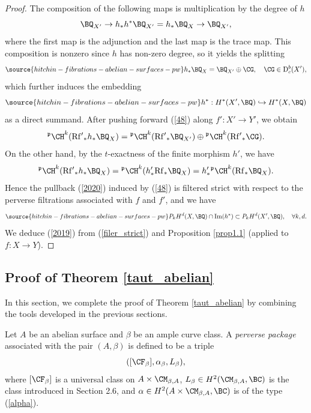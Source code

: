 \begin{proof}
The composition of the following maps is multiplication by the degree of $h$
\[
\BQ_{X'} \to h_*h^* \BQ_{X'} = h_*\BQ_X \to \BQ_{X'},
\]
where the first map is the adjunction and the last map is the trace map. This composition is nonzero since $h$ has non-zero degree, so it yields the splitting
\begin{equation}\label{48}
\source{hitchin-fibrations-abelian-surfaces-pw}
h_* \BQ_X = \BQ_{X'} \oplus \CG, \quad \CG \in \mathrm{D}^b_c(X'),
\end{equation}
which further induces the embedding
\begin{equation}\label{2020}
\source{hitchin-fibrations-abelian-surfaces-pw}
h^*: H^*(X', \BQ) \hookrightarrow H^*(X, \BQ)
\end{equation}
as a  direct summand. After pushing forward (\ref{48}) along $f': X' \to Y'$, we obtain
\[
{^\mathfrak{p} \CH}^k(\mathrm{Rf'}_\ast h_\ast \BQ_X) = {^\mathfrak{p} \CH}^k(\mathrm{Rf'}_\ast \BQ_{X'}) \oplus {^\mathfrak{p} \CH}^k(\mathrm{Rf'}_\ast \CG).
\]
On the other hand, by the $t$-exactness of the finite morphism $h'$, we have
\[
{^\mathfrak{p} \CH}^k(\mathrm{Rf'}_\ast h_\ast \BQ_X) = {^\mathfrak{p} \CH}^k(h'_*\mathrm{Rf}_\ast \BQ_X)  =h'_* {^\mathfrak{p} \CH}^k(\mathrm{Rf}_\ast \BQ_X).
\]
Hence the pullback (\ref{2020}) induced by (\ref{48}) is filtered strict with respect to the perverse filtrations associated with $f$ and $f'$, and we have
\begin{equation}\label{filer_strict}
\source{hitchin-fibrations-abelian-surfaces-pw}
P_kH^d(X, \BQ) \cap \mathrm{Im}(h^*) \subset P_kH^d(X', \BQ),\quad \forall k,d.
\end{equation}
We deduce (\ref{2019}) from (\ref{filer_strict}) and Proposition \ref{prop1.1} (applied to $f: X\to Y$).
\end{proof}


\subsection{Proof of Theorem \ref{taut_abelian}}\label{Section2.7} In this section, we complete the proof of Theorem \ref{taut_abelian} by combining the tools developed in the previous sections.

Let $A$ be an abelian surface and $\beta$ be an ample curve class. A \emph{perverse package} associated with the pair $(A, \beta)$ is defined to be a triple
\[
 ([\CF_\beta], \alpha_\beta, L_\beta),
\]
where $[\CF_\beta]$ is a universal class on $A \times \CM_{\beta,A}$, $L_\beta \in H^2(\CM_{\beta,A}, \BC)$ is the class introduced in Section 2.6, and $\alpha \in H^2(A\times \CM_{\beta,A}, \BC)$ is of the type (\ref{alpha}).

